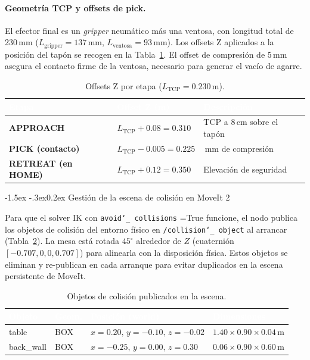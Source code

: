 \documentclass[12pt,a4paper]{article}
\makeatletter
\renewcommand\subsubsection{\@startsection{subsubsection}{3}{\z@}%
  {-1.5ex \@plus -.3ex}{0.2ex}%
  {\normalsize\bfseries\color{MediumBlue}}}
\newcommand{\rowA}{\rowcolor{LightGray}}
\newcommand{\rowB}{\rowcolor{white}}
\newcommand{\code}[1]{%
  \begingroup
  \def\_{\char`_\penalty0 }%
  \def\/{\char`/\penalty0 }%
  \texttt{\small #1}%
  \endgroup}
\makeatother
\begin{document}
\paragraph{Geometría TCP y offsets de pick.}
El efector final es un \textit{gripper} neumático más una ventosa, con longitud total de 230\,mm
($L_{\text{gripper}}=137$\,mm, $L_{\text{ventosa}}=93$\,mm). Los offsets Z aplicados a la posición del
tapón se recogen en la Tabla~\ref{tab:offsets}. El offset de compresión de 5\,mm asegura el contacto
firme de la ventosa, necesario para generar el vacío de agarre.

\begin{table}[H]
\centering
\caption{Offsets Z por etapa ($L_{\text{TCP}}=0.230$\,m).}
\label{tab:offsets}
\small
\renewcommand{\arraystretch}{1.25}
\begin{tabularx}{\textwidth}{|>{\bfseries}l|l|>{\RaggedRight\arraybackslash}X|}
  \hline
  \rowcolor{BlueHeader}
  \textcolor{white}{\bfseries Etapa} &
  \textcolor{white}{\bfseries Offset Z (m)} &
  \textcolor{white}{\bfseries Descripción} \\
  \hline
  \rowA APPROACH & $L_{\text{TCP}}+0.08=0.310$ & TCP a 8\,cm sobre el tapón \\
  \rowB PICK (contacto) & $L_{\text{TCP}}-0.005=0.225$ & 5\,mm de compresión \\
  \rowA RETREAT (en HOME) & $L_{\text{TCP}}+0.12=0.350$ & Elevación de seguridad \\
  \hline
\end{tabularx}
\end{table}

\subsubsection{Gestión de la escena de colisión en MoveIt 2}

Para que el solver IK con \code{avoid\_collisions}=True funcione, el nodo publica los objetos de colisión
del entorno físico en \code{/collision\_object} al arrancar (Tabla~\ref{tab:collision}). La mesa está
rotada $45^\circ$ alrededor de $Z$ (cuaternión $[-0.707,0,0,0.707]$) para alinearla con la disposición
física. Estos objetos se eliminan y re-publican en cada arranque para evitar duplicados en la escena
persistente de MoveIt.

\begin{table}[H]
\centering
\caption{Objetos de colisión publicados en la escena.}
\label{tab:collision}
\small
\renewcommand{\arraystretch}{1.25}
\begin{tabularx}{\textwidth}{|>{\ttfamily}l|l|l|>{\RaggedRight\arraybackslash}X|}
  \hline
  \rowcolor{BlueHeader}
  \textcolor{white}{\bfseries Objeto} &
  \textcolor{white}{\bfseries Geom.} &
  \textcolor{white}{\bfseries Posición (world)} &
  \textcolor{white}{\bfseries Dimensiones} \\
  \hline
  \rowA table & BOX & $x{=}0.20,\,y{=}{-}0.10,\,z{=}{-}0.02$ & $1.40\times0.90\times0.04$\,m \\
  \rowB back\_wall & BOX & $x{=}{-}0.25,\,y{=}0.00,\,z{=}0.30$ & $0.06\times0.90\times0.60$\,m \\
  \hline
\end{tabularx}
\end{table}
\end{document}
